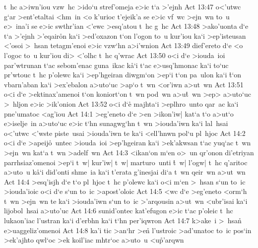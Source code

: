 t~hc
a>iwn'iou
vzw~hc
>ido`u
stref'omeja
e>ic
t`a
>'ejnh\bibvsend
\vs Act 13:47
o<'utwc
g`ar
>ent'etaltai
<hm~in
<o
k'urioc
t'ejeik'a
se
e>ic
vf~wc
>ejn~wn
to~u
e>~ina'i
se
e>ic
swthr'ian
<'ewc
>esq'atou
t~hc
g~hc\bibvsend
\vs Act 13:48
>ako'uonta
d`e
t`a
>'ejnh
>'eqair\r{o}n
ka`i
>ed'oxazon
t`on
l'ogon
to~u
kur'iou
ka`i
>ep'isteusan
<'osoi
>~hsan
tetagm'enoi
e>ic
vzw`hn
a>i'wnion\bibvsend
\vs Act 13:49
dief'ereto
d`e
<o
l'ogoc
to~u
kur'iou
di>
<'olhc
t~hc
q'wrac\bibvsend
\vs Act 13:50
o<i
d`e
>iouda~ioi
par'wtrunan
t`ac
sebom'enac
guna~ikac
k\r{a}`i
t`ac
e>usq'hmonac
ka`i
to`uc
pr'wtouc
t~hc
p'olewc
ka`i
>ep'hgeiran
diwgm`on
>ep`i
t`on
pa~ulon
ka`i
\r{t}`on
vbarn'aban
ka`i
>ex'ebalon
a>uto`uc
>ap`o
t~wn
<or'iwn
a>ut~wn\bibvsend
\vs Act 13:51
o<i
d`e
>ektinax'amenoi
t`on
koniort`on
t~wn
pod~wn
a>u\r{t}~wn
>ep>
a>uto`uc
>~hljon
e>ic
>ik'onion\bibvsend
\vs Act 13:52
o<i
d`e\r{}
majhta`i
>eplhro~unto
qar~ac
ka`i
pne'umatoc
<ag'iou\bibvsend
\vs Act 14:1
>eg'eneto
d`e
>en
>ikon'iw|
kat`a
t`o
a>ut`o
e>iselje~in
a>uto`uc
e>ic
t`hn
sunagwg`hn
t~wn
>iouda'iwn
ka`i
lal~hsai
o<'utwc
<'wste
piste~usai
>iouda'iwn
te
ka`i
<ell'hnwn
pol`u
pl~hjoc\bibvsend
\vs Act 14:2
o<i
d`e
>apeij\r{o}~untec
>iouda~ioi
>ep'hgeiran
ka`i
>ek'akwsan
t`ac
yuq`ac
t~wn
>ejn~wn
kat`a
t~wn
>adelf~wn\bibvsend
\vs Act 14:3
<ikan`on
m`en
o>~un
qr'onon
di'etriyan
parrhsiaz'omenoi
>ep`i
t~w|
kur'iw|
t~w|
marturo~unti
\r{t}~w|
l'ogw|
t~hc
q'aritoc
a>uto~u
k\r{a}`i
did'onti
shme~ia
ka`i
t'erata
g'inesjai
di`a
t~wn
qeir~wn
a>ut~wn\bibvsend
\vs Act 14:4
>esq'isjh
d`e
t`o
pl~hjoc
t~hc
p'olewc
ka`i
o<i
m`en
>~hsan
s`un
to~ic
>iouda'ioic
o<i
d`e
s`un
to~ic
>apost'oloic\bibvsend
\vs Act 14:5
<wc
d`e
>eg'eneto
<orm`h
t~wn
>ejn~wn
te
ka`i
>iouda'iwn
s`un
to~ic
>'arqousin
a>ut~wn
<ubr'isai
ka`i
lijobol~hsai
a>uto'uc\bibvsend
\vs Act 14:6
sunid'ontec
kat'efugon
e>ic
t`ac
p'oleic
t~hc
lukaon'iac
l'ustran
ka`i
d'erbhn
ka`i
t`hn
per'iqwron\bibvsend
\vs Act 14:7
k>ake~i
>~hsan\r{}
e>uaggeliz'omenoi\bibvsend
\vs Act 14:8
ka'i
tic
>an`hr
>en\r{}
l'ustroic
>ad'unatoc
to~ic
pos`in
>ek'ajhto
qwl`oc
>ek
koil'iac
mhtr`oc
a>uto~u
<u\r{p}'arqwn

